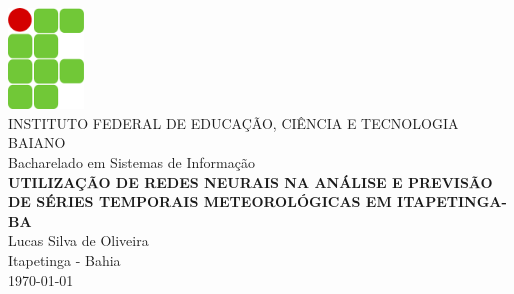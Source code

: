 \documentclass[12pt, openright, a4paper, brazil, oneside]{abntex2}
\begin{document}
    \begin{capa}
        \center
        \includegraphics[width=2cm]{template/ifbaiano.png}\\[0.2cm]
        {\ABNTEXchapterfont\large INSTITUTO FEDERAL DE EDUCAÇÃO, CIÊNCIA E TECNOLOGIA BAIANO}\\[0.2cm]
        {\ABNTEXchapterfont\large Bacharelado em Sistemas de Informação} \\[4cm]

        {\ABNTEXchapterfont\bfseries\LARGE UTILIZAÇÃO DE REDES NEURAIS NA ANÁLISE E PREVISÃO DE SÉRIES TEMPORAIS METEOROLÓGICAS EM ITAPETINGA-BA}\\[4cm]

        {\ABNTEXchapterfont\large Lucas Silva de Oliveira}\\[4cm]

        \vfill
        \large Itapetinga - Bahia\\
        \today
    \end{capa}
\end{document}
